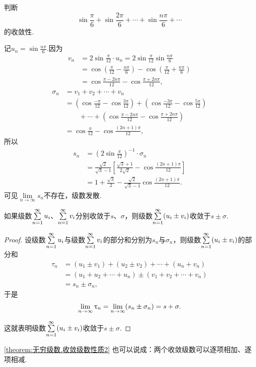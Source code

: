 \begin{example}
判断\[
\sin\frac{\pi}{6}+\sin\frac{2\pi}{6}+\dotsb+\sin\frac{n\pi}{6}+\dotsb
\]的收敛性.
\begin{solution}
记\(u_n = \sin\frac{n\pi}{6}\).因为\[
\begin{split}
v_n &= 2\sin\frac{\pi}{12} \cdot u_n
= 2\sin\frac{\pi}{12} \sin\frac{n\pi}{6} \\
&= \cos(\frac{\pi}{12}-\frac{n\pi}{6}) - \cos(\frac{\pi}{12}+\frac{n\pi}{6}) \\
&= \cos\frac{\pi-2n\pi}{12} - \cos\frac{\pi+2n\pi}{12},
\end{split}
\]\[
\begin{split}
\sigma_n &= v_1 + v_2 + \dotsb + v_n \\
&= \left(\cos\frac{-\pi}{12} - \cos\frac{3\pi}{12}\right)
	+ \left(\cos\frac{-3\pi}{12} - \cos\frac{5\pi}{12}\right) \\
	&\qquad+\dotsb+ \left(\cos\frac{\pi-2n\pi}{12} - \cos\frac{\pi+2n\pi}{12}\right) \\
&= \cos\frac{\pi}{12} - \cos\frac{(2n+1)\pi}{12},
\end{split}
\]所以\[
\begin{split}
s_n &= \left(2\sin\frac{\pi}{12}\right)^{-1} \cdot \sigma_n \\
&= \frac{\sqrt{2}}{\sqrt{3}-1} \left[ \frac{\sqrt{3}+1}{2\sqrt{2}} - \cos\frac{(2n+1)\pi}{12} \right] \\
&= 1+\frac{\sqrt{3}}{2} - \frac{\sqrt{2}}{\sqrt{3}-1} \cos\frac{(2n+1)\pi}{12}.
\end{split}
\]
可见\(\lim\limits_{n\to\infty} s_n\)不存在，级数发散.
\end{solution}
\end{example}

\begin{property}\label{theorem:无穷级数.收敛级数性质2}
如果级数\(\sum\limits_{n=1}^{\infty} u_i\)、\(\sum\limits_{n=1}^{\infty} v_i\)分别收敛于\(s\)、\(\sigma\)，则级数\(\sum\limits_{n=1}^{\infty} (u_i \pm v_i)\)收敛于\(s \pm \sigma\).
\begin{proof}
设级数\(\sum\limits_{n=1}^{\infty} u_i\)与级数\(\sum\limits_{n=1}^{\infty} v_i\)的部分和分别为\(s_n\)与\(\sigma_n\)，则级数\(\sum\limits_{n=1}^{\infty} (u_i \pm v_i)\)的部分和\[
\begin{split}
\tau_n &= (u_1 \pm v_1) + (u_2 \pm v_2) + \dotsb + (u_n + v_n) \\
&= (u_1 + u_2 + \dotsb + u_n) \pm (v_1 + v_2 + \dotsb + v_n) \\
&= s_n \pm \sigma_n,
\end{split}
\]于是\[
\lim\limits_{n\to\infty} \uptau_n = \lim\limits_{n\to\infty} (s_n \pm \sigma_n) = s + \sigma.
\]

这就表明级数\(\sum\limits_{n=1}^{\infty} (u_i \pm v_i)\)收敛于\(s \pm \sigma\).
\end{proof}
\end{property}
\cref{theorem:无穷级数.收敛级数性质2} 也可以说成：{\color{red}两个收敛级数可以逐项相加、逐项相减.}

